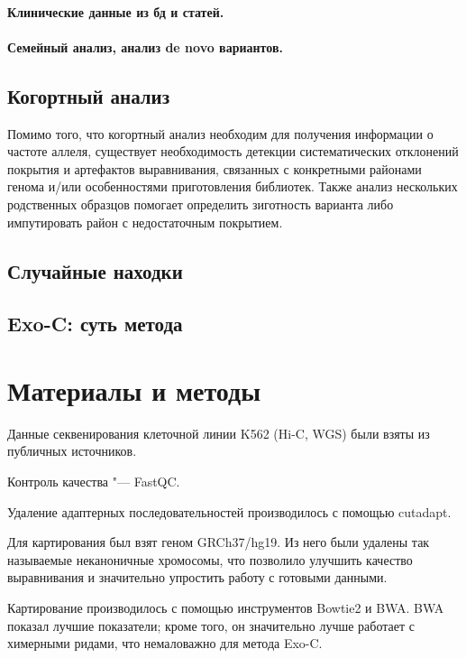 \documentclass[a4paper,12pt]{article}
\begin{document}
\paragraph{Клинические данные из бд и статей.}

\paragraph{Семейный анализ, анализ de novo вариантов.}

\subsection{Когортный анализ}

Помимо того, что когортный анализ необходим для получения информации о частоте аллеля, существует необходимость детекции систематических отклонений покрытия и артефактов выравнивания, связанных с конкретными районами генома и/или особенностями приготовления библиотек. Также анализ нескольких родственных образцов помогает определить зиготность варианта либо импутировать район с недостаточным покрытием.

\subsection{Случайные находки}

\subsection{Exo-C: суть метода}

\section{Материалы и методы}

Данные секвенирования клеточной линии K562 (Hi-C\cite{rao}, WGS\cite{zhou}\cite{dixon}) были взяты из публичных источников.

Контроль качества "--- FastQC\cite{fastqc}.

Удаление адаптерных последовательностей производилось с помощью cutadapt\cite{cutadapt}.

Для картирования был взят геном GRCh37/hg19.
Из него были удалены так называемые неканоничные хромосомы, что позволило улучшить качество выравнивания и значительно упростить работу с готовыми данными.

Картирование производилось с помощью инструментов Bowtie2\cite{bowtie2} и BWA\cite{bwa}.
BWA показал лучшие показатели;
кроме того, он значительно лучше работает с химерными ридами, что немаловажно для метода Exo-C.
\end{document}
